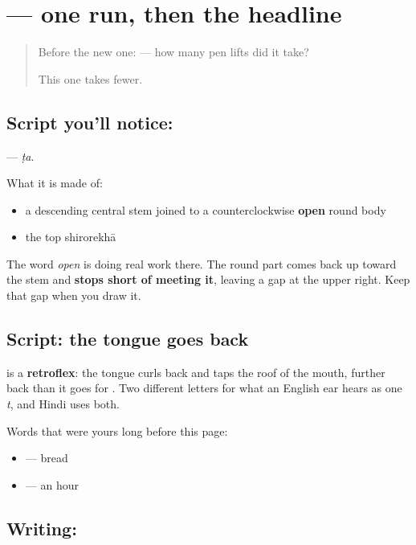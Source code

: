 \section[\texorpdfstring{\hi{ट} (ṭa)}{ट (ṭa)}]{ — one run, then the headline}

\label{lesson:HI-S142-letter-ta-retroflex}



\begin{quote}
Before the new one: \textbf{} — how many pen lifts did it take?

This one takes fewer.
\end{quote}

\subsection*{Script you'll notice: }
\textbf{} — \emph{ṭa}.

What it is made of:

\begin{itemize}
\raggedright
  \item a descending central stem joined to a counterclockwise \textbf{open} round body
  \item the top shirorekhā
\end{itemize}

The word \emph{open} is doing real work there. The round part comes back up toward the stem and \textbf{stops short of meeting it}, leaving a gap at the upper right. Keep that gap when you draw it.

\subsection*{Script: the tongue goes back}
\textbf{} is a \textbf{retroflex}: the tongue curls back and taps the roof of the mouth, further back than it goes for \textbf{}. Two different letters for what an English ear hears as one \emph{t}, and Hindi uses both.

Words that were yours long before this page:

\begin{itemize}
\raggedright
  \item \textbf{} — bread
  \item \textbf{} — an hour
\end{itemize}

\subsection*{Writing: }

